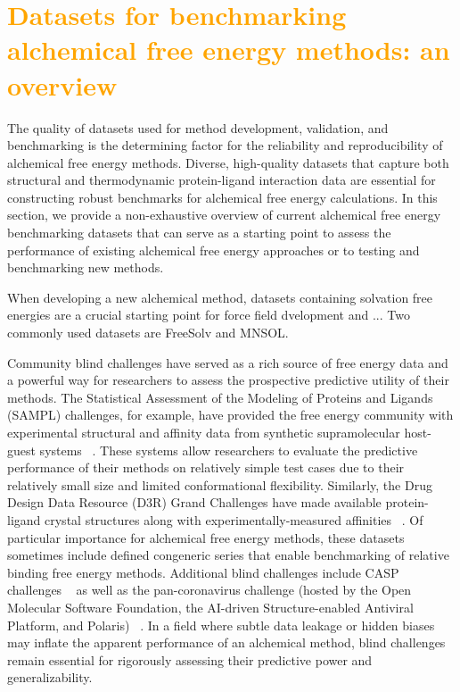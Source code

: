 \documentclass[9pt,bestpractices,pubversion]{livecoms}
\makeatletter
\newcommand{\tocorange}[1]{\textcolor{orange}{#1}}
\newcommand{\tocsectioncomment}[1]{%
  \addtocontents{toc}{%
    {\leftskip \cftsecindent\relax
     \advance\leftskip \cftsecnumwidth\relax
     \rightskip \@tocrmarg\relax
     \textit{#1}\protect\par}}%
  \textit{#1}\par}
\makeatother
\begin{document}
\section{\tocorange{Datasets for benchmarking alchemical free energy methods: an overview}}
\label{sec:benchmark}
The quality of datasets used for method development, validation, and benchmarking is the determining factor for the reliability and reproducibility of alchemical free energy methods. Diverse, high-quality datasets that capture both structural and thermodynamic protein-ligand interaction data are essential for constructing robust benchmarks for alchemical free energy calculations. In this section, we provide a non-exhaustive overview of current alchemical free energy benchmarking datasets that can serve as a starting point to assess the performance of existing alchemical free energy approaches or to testing and benchmarking new methods. 

When developing a new alchemical method, datasets containing solvation free energies are a crucial starting point for force field dvelopment and ... Two commonly used datasets are FreeSolv and MNSOL. 

Community blind challenges have served as a rich source of free energy data and a powerful way for researchers to assess the prospective predictive utility of their methods. The Statistical Assessment of the Modeling of Proteins and Ligands (SAMPL) challenges, for example, have provided the free energy community with experimental structural and affinity data from synthetic supramolecular host-guest systems ~\cite{
amezcua_sampl9_2024, amezcua_overview_2022, amezcua_sampl7_2021, rizzi_overview_2018, yin_overview_2017, muddana_sampl4_2014}. These systems allow researchers to evaluate the predictive performance of their methods on relatively simple test cases due to their relatively small size and limited conformational flexibility. Similarly, the Drug Design Data Resource (D3R) Grand Challenges have made available protein-ligand crystal structures along with experimentally-measured affinities ~\cite{parks_d3r_2020, gaieb_d3r_2019, gaieb_d3r_2018, gathiaka_d3r_2016}. Of particular importance for alchemical free energy methods, these datasets sometimes include defined congeneric series that enable benchmarking of relative binding free energy methods. Additional blind challenges include CASP challenges ~\cite{gilson_assessment_2025} as well as the pan-coronavirus challenge (hosted by the Open Molecular Software Foundation, the AI-driven Structure-enabled Antiviral Platform, and Polaris) ~\cite{macdermott-opeskin_computational_2025}. In a field where subtle data leakage or hidden biases may inflate the apparent performance of an alchemical method, blind challenges remain essential for rigorously assessing their predictive power and generalizability. 
\end{document}
